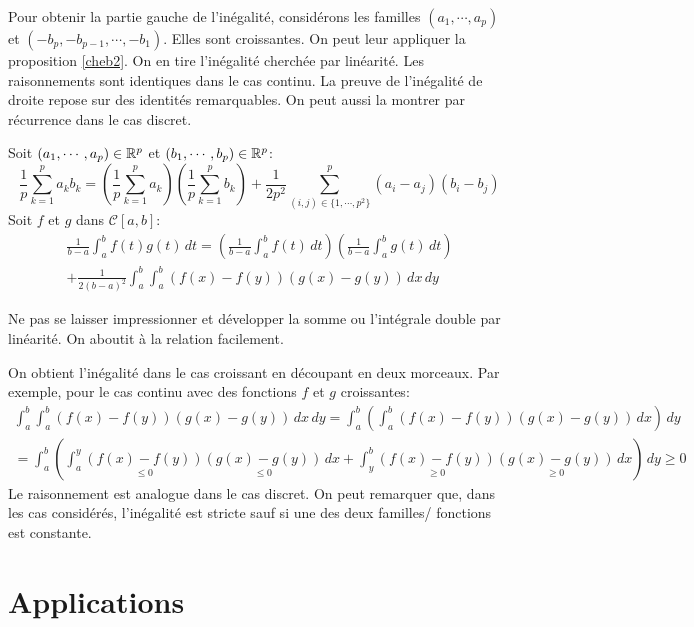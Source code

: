 Pour obtenir la partie gauche de l'inégalité, considérons les familles $(a_1,\cdots,a_p)$ et $(-b_p, -b_{p-1}, \cdots, -b_1)$. Elles sont croissantes. On peut leur appliquer la proposition \ref{cheb2}. On en tire l'inégalité cherchée par linéarité.\newline
Les raisonnements sont identiques dans le cas continu.\newline
La preuve de l'inégalité de droite repose sur des identités remarquables. On peut aussi la montrer par récurrence dans le cas discret.
\begin{prop}
Soit $(a_1,\cdots,a_p)\in \mathbb{R}^p$ et $(b_1,\cdots,b_p)\in \mathbb{R}^p$:
\begin{displaymath}
\frac{1}{p}\sum_{k=1}^p a_kb_k = \left(\frac{1}{p}\sum_{k=1}^p a_k \right) \left(\frac{1}{p}\sum_{k=1}^p b_k \right)
+ \frac{1}{2p^2}\sum_{(i,j)\in \{1,\cdots,p^2\}}^p (a_i-a_j)(b_i-b_j)
\end{displaymath}
Soit $f$ et $g$ dans $\mathcal{C}[a,b]$:
\begin{multline*}
  \frac{1}{b-a}\int_a^bf(t)g(t)\,dt =
\left(\frac{1}{b-a}\int_a^bf(t)\,dt \right) \left(\frac{1}{b-a}\int_a^bg(t)\,dt \right)\\
+ \frac{1}{2(b-a)^2}\int_a^b \int_a^b(f(x)-f(y))(g(x)-g(y))\,dx\,dy
\end{multline*}
\end{prop}
\begin{demo}
  Ne pas se laisser impressionner et développer la somme ou l'intégrale double par linéarité. On aboutit à la relation facilement.
\end{demo}
On obtient l'inégalité dans le cas croissant en découpant en deux morceaux. Par exemple, pour le cas continu avec des fonctions $f$ et $g$ croissantes:
\begin{multline*}
\int_a^b \int_a^b(f(x)-f(y))(g(x)-g(y))\,dx\,dy
= \int_a^b \left( \int_a^b(f(x)-f(y))(g(x)-g(y))\,dx\right) \,dy \\
= \int_a^b \left( 
\int_a^y\underset{\leq 0}{(f(x)-f(y))}\underset{\leq 0}{(g(x)-g(y))}\,dx 
+ \int_y^b\underset{\geq 0}{(f(x)-f(y))}\underset{\geq 0}{(g(x)-g(y))}\,dx
\right) \,dy \geq 0
\end{multline*}
Le raisonnement est analogue dans le cas discret. On peut remarquer que, dans les cas considérés, l'inégalité est stricte sauf si une des deux familles/ fonctions est constante.

\section{Applications}
